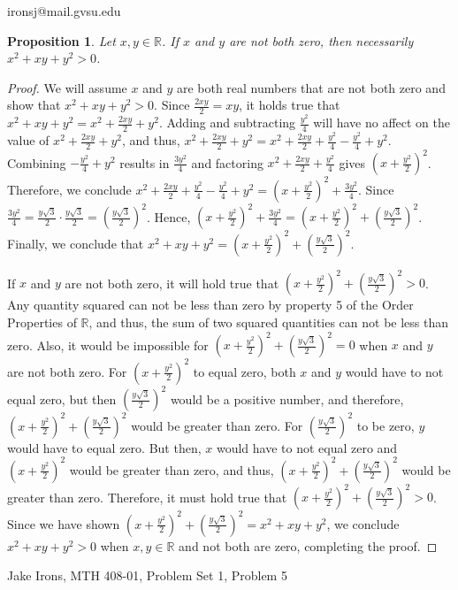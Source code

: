\documentclass[11 pt]{article}
\newtheorem{proposition}{Proposition}
\newcommand{\newpar}{\vspace{.15in}\noindent}
\begin{document}
\noindent ironsj@mail.gvsu.edu
\newpar
\begin{proposition}
Let $x, y \in \mathbb{R}$. If $x$ and $y$ are not both zero, then necessarily $x^2+xy+y^2>0$.
\end{proposition}
\begin{proof}
We will assume $x$ and $y$ are both real numbers that are not both zero and show that $x^2+xy+y^2>0$. Since $\frac{2xy}{2}=xy$, it holds true that $x^2+xy+y^2=x^2+\frac{2xy}{2}+y^2$. Adding and subtracting $\frac{y^2}{4}$ will have no affect on the value of $x^2+\frac{2xy}{2}+y^2$, and thus, $x^2+\frac{2xy}{2}+y^2=x^2+\frac{2xy}{2}+\frac{y^2}{4}-\frac{y^2}{4}+y^2$. Combining $-\frac{y^2}{4}+y^2$ results in $\frac{3y^2}{4}$ and factoring $x^2+\frac{2xy}{2}+\frac{y^2}{4}$ gives $(x+\frac{y^2}{2})^2$. Therefore, we conclude $x^2+\frac{2xy}{2}+\frac{y^2}{4}-\frac{y^2}{4}+y^2=(x+\frac{y^2}{2})^2+\frac{3y^2}{4}$. Since $\frac{3y^2}{4}=\frac{y\sqrt{3}}{2}\cdot\frac{y\sqrt{3}}{2}=(\frac{y\sqrt{3}}{2})^2$. Hence, $(x+\frac{y^2}{2})^2+\frac{3y^2}{4}=(x+\frac{y^2}{2})^2+(\frac{y\sqrt{3}}{2})^2$. Finally, we conclude that $x^2+xy+y^2=(x+\frac{y^2}{2})^2+(\frac{y\sqrt{3}}{2})^2$.

\newpar
If $x$ and $y$ are not both zero, it will hold true that $(x+\frac{y^2}{2})^2+(\frac{y\sqrt{3}}{2})^2>0$. Any quantity squared can not be less than zero by property 5 of the Order Properties of $\mathbb{R}$, and thus, the sum of two squared quantities can not be less than zero. Also, it would be impossible for $(x+\frac{y^2}{2})^2+(\frac{y\sqrt{3}}{2})^2=0$ when $x$ and $y$ are not both zero. For $(x+\frac{y^2}{2})^2$ to equal zero, both $x$ and $y$ would have to not equal zero, but then $(\frac{y\sqrt{3}}{2})^2$ would be a positive number, and therefore, $(x+\frac{y^2}{2})^2+(\frac{y\sqrt{3}}{2})^2$ would be greater than zero. For $(\frac{y\sqrt{3}}{2})^2$ to be zero, $y$ would have to equal zero. But then, $x$ would have to not equal zero and $(x+\frac{y^2}{2})^2$ would be greater than zero, and thus, $(x+\frac{y^2}{2})^2+(\frac{y\sqrt{3}}{2})^2$ would be greater than zero. Therefore, it must hold true that $(x+\frac{y^2}{2})^2+(\frac{y\sqrt{3}}{2})^2>0$. Since we have shown $(x+\frac{y^2}{2})^2+(\frac{y\sqrt{3}}{2})^2=x^2+xy+y^2$, we conclude $x^2+xy+y^2>0$ when $x,y\in\mathbb{R}$ and not both are zero, completing the proof.  

\end{proof}
\newpage
\noindent Jake Irons, MTH 408-01, Problem Set 1, Problem 5
\end{document}
